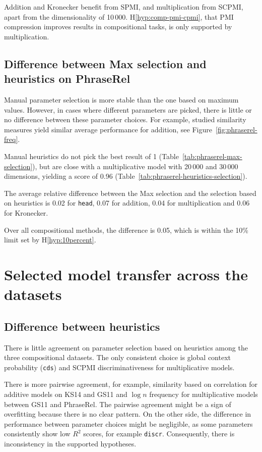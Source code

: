 Addition and Kronecker benefit from SPMI, and multiplication from SCPMI, apart from the dimensionality of 10\,000. H\ref{hyp:comp-pmi-cpmi}, that PMI compression improves results in compositional tasks, is only supported by multiplication.

\subsection{Difference between Max selection and heuristics on PhraseRel}
\label{sec:diff-phraserel}

Manual parameter selection is more stable than the one based on maximum values. However, in cases where different parameters are picked, there is little or no difference between these parameter choices. For example, studied similarity measures yield similar average performance for addition, see Figure~\ref{fig:phraserel-freq}.

Manual heuristics do not pick the best result of 1 (Table~\ref{tab:phraserel-max-selection}), but are close with a multiplicative model with 20\,000 and 30\,000 dimensions, yielding a score of 0.96 (Table~\ref{tab:phraserel-heuristics-selection}).

The average relative difference between the Max selection and the selection based on heuristics is 0.02 for \texttt{head}, 0.07 for addition, 0.04 for multiplication and 0.06 for Kronecker.

Over all compositional methods, the difference is 0.05, which is within the 10\% limit set by H\ref{hyp:10percent}.

\section{Selected model transfer across the datasets}
\label{sec:select-model-transf-comp}



\subsection{Difference between heuristics}
\label{sec:diff-betw-heur-comp}

There is little agreement on parameter selection based on heuristics among the three compositional datasets. The only consistent choice is global context probability (\texttt{cds}) and SCPMI discriminativeness for multiplicative models.

There is more pairwise agreement, for example, similarity based on correlation for additive models on KS14 and GS11 and $\log n$ frequency for multiplicative models between GS11 and PhraseRel. The pairwise agreement might be a sign of overfitting because there is no clear pattern. On the other side, the difference in performance between parameter choices might be negligible, as some parameters consistently show low $R^2$ scores, for example \texttt{discr}. Consequently, there is inconsistency in the supported hypotheses.


